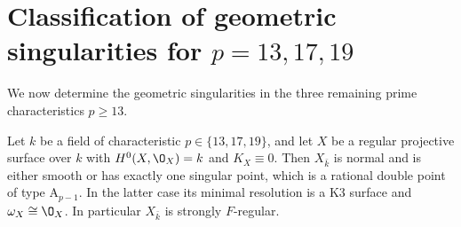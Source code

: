 \section{Classification of geometric singularities for \texorpdfstring{$p = 13,17,19$}{p=13,17,19}}\label{sec:small-primes-sing}\label{subsec:small-primes-sing}

We now determine the geometric singularities in the three remaining prime characteristics $p\geq 13$.

\begin{proposition}\label{prop:small-primes-sing}\label{prop:p13-sing}\label{prop:p17-sing}\label{prop:p19-sing}\label{rem:smooth-remaining}
Let $k$ be a field of characteristic $p\in\{13,17,19\}$, and let $X$ be a regular projective surface over $k$ with $H^0(X,\O_X) = k$ and $K_X\equiv 0$.
Then $X_{\bar k}$ is normal and is either smooth or has exactly one singular point, which is a rational double point of type $\mathrm A_{p-1}$.
In the latter case its minimal resolution is a K3 surface and $\omega_X\cong\O_X$.
In particular $X_{\bar k}$ is strongly $F$-regular.
\end{proposition}

